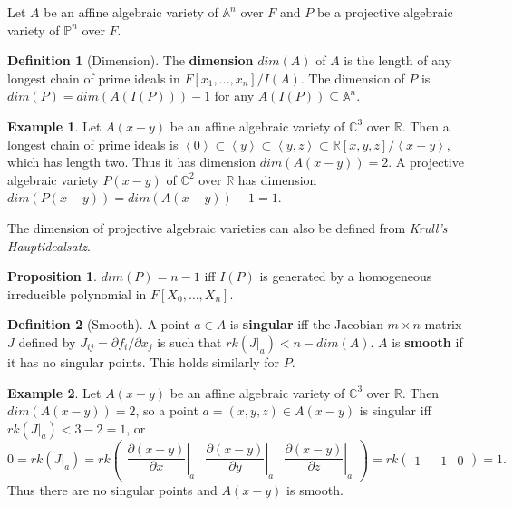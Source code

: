\documentclass{article}
\newcommand{\R}{\mathbb{R}}
\newcommand{\C}{\mathbb{C}}
\newcommand{\A}{\mathbb{A}}
\renewcommand{\P}{\mathbb{P}}
\newcommand{\val}[1]{\left. #1 \right\rvert}
\newcommand{\rb}[1]{\left( #1 \right)}
\renewcommand{\sb}[1]{\left[ #1 \right]}
\newcommand{\ab}[1]{\left\langle #1 \right\rangle}
\newcommand{\onebythree}[3]{\begin{pmatrix} #1 & #2 & #3 \end{pmatrix}}
\theoremstyle{definition}
\newtheorem*{definition}{Definition}
\newtheorem*{example}{Example}
\newtheorem{proposition}{Proposition}[subsection]
\begin{document}
Let $ A $ be an affine algebraic variety of $ \A^n $ over $ F $ and $ P $ be a projective algebraic variety of $ \P^n $ over $ F $.

\begin{definition}[Dimension]
The \textbf{dimension} $ dim\rb{A} $ of $ A $ is the length of any longest chain of prime ideals in $ F\sb{x_1, \dots, x_n} / I\rb{A} $. The dimension of $ P $ is $ dim\rb{P} = dim\rb{A\rb{I\rb{P}}} - 1 $ for any $ A\rb{I\rb{P}} \subseteq \A^n $.
\end{definition}

\begin{example}
Let $ A\rb{x - y} $ be an affine algebraic variety of $ \C^3 $ over $ \R $. Then a longest chain of prime ideals is $ \ab{0} \subset \ab{y} \subset \ab{y, z} \subset \R\sb{x, y, z} / \ab{x - y} $, which has length two. Thus it has dimension $ dim\rb{A\rb{x - y}} = 2 $. A projective algebraic variety $ P\rb{x - y} $ of $ \C^2 $ over $ \R $ has dimension $ dim\rb{P\rb{x - y}} = dim\rb{A\rb{x - y}} - 1 = 1 $.
\end{example}

The dimension of projective algebraic varieties can also be defined from \emph{Krull's Hauptidealsatz}.

\begin{proposition}
$ dim\rb{P} = n - 1 $ iff $ I\rb{P} $ is generated by a homogeneous irreducible polynomial in $ F\sb{X_0, \dots, X_n} $.
\end{proposition}

\begin{definition}[Smooth]
A point $ a \in A $ is \textbf{singular} iff the Jacobian $ m \times n $ matrix $ J $ defined by $ J_{ij} = \partial f_i / \partial x_j $ is such that $ rk\rb{\val{J}_a} < n - dim\rb{A} $. $ A $ is \textbf{smooth} if it has no singular points. This holds similarly for $ P $.
\end{definition}

\begin{example}
Let $ A\rb{x - y} $ be an affine algebraic variety of $ \C^3 $ over $ \R $. Then $ dim\rb{A\rb{x - y}} = 2 $, so a point $ a = \rb{x, y, z} \in A\rb{x - y} $ is singular iff $ rk\rb{\val{J}_a} < 3 - 2 = 1 $, or
$$ 0 = rk\rb{\val{J}_a} = rk\onebythree{\val{\dfrac{\partial \rb{x - y}}{\partial x}}_a}{\val{\dfrac{\partial \rb{x - y}}{\partial y}}_a}{\val{\dfrac{\partial \rb{x - y}}{\partial z}}_a} = rk\onebythree{1}{-1}{0} = 1. $$
Thus there are no singular points and $ A\rb{x - y} $ is smooth.
\end{example}
\end{document}
